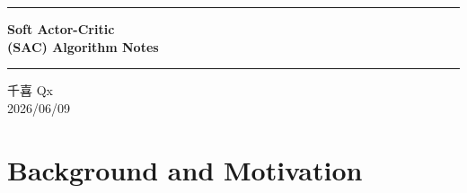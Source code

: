 \documentclass[12pt,a4paper]{article}
\theoremstyle{noteplain}
\theoremstyle{noteexercise}
\begin{document}



\thispagestyle{empty}



\vspace*{1cm}



\begin{center}
  \parbox{0.9\textwidth}{
    \centering
    \rule[6pt]{0.9\textwidth}{2pt}
    \vspace{0.3cm}
    {\LARGE\bfseries\color{deepblue} Soft Actor-Critic \\[0.4em] (SAC) Algorithm Notes}
    \vspace{0.3cm}
    \rule[6pt]{0.9\textwidth}{2pt}
  }
\end{center}



\vspace{0.8cm}



\begin{center}
  \begin{minipage}{0.7\textwidth}
    \centering
    \large\rmfamily\color{authorred}
    千喜 Qx \\[0.6em]
    \normalsize\rmfamily\color{darkgray} 2026/06/09
  \end{minipage}
\end{center}



\vspace{1cm}



\tableofcontents



\newpage


\pagestyle{fancy}






\section{Background and Motivation}\label{sec:bg}
\end{document}

